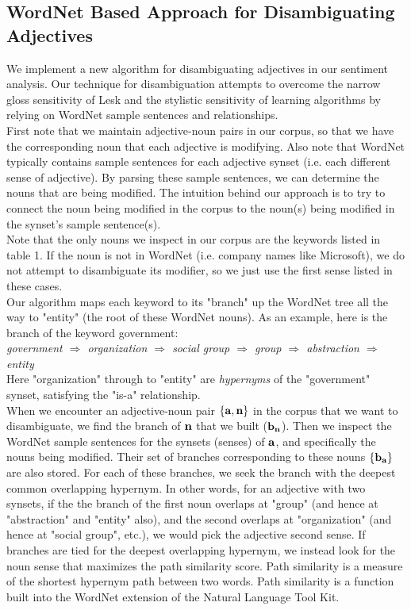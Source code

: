 \documentclass[pageno]{jpaper}
\begin{document}
\subsection{WordNet Based Approach for Disambiguating Adjectives}
\indent We implement a new algorithm for disambiguating adjectives in our sentiment analysis. Our technique for disambiguation attempts to overcome the narrow gloss sensitivity of Lesk and the stylistic sensitivity of learning algorithms by relying on WordNet sample sentences and relationships. \\
\indent First note that we maintain adjective-noun pairs in our corpus, so that we have the corresponding noun that each adjective is modifying. Also note that WordNet typically contains sample sentences for each adjective synset (i.e. each different sense of adjective). By parsing these sample sentences, we can determine the nouns that are being modified. The intuition behind our approach is to try to connect the noun being modified in the corpus to the noun(s) being modified in the synset's sample sentence(s). \\ \indent Note that the only nouns we inspect in our corpus are the keywords listed in table 1. If the noun is not in WordNet (i.e. company names like Microsoft), we do not attempt to disambiguate its modifier, so we just use the first sense listed in these cases. \\ 
\indent Our algorithm maps each keyword to its "branch" up the WordNet tree all the way to "entity" (the root of these WordNet nouns). As an example, here is the branch of the keyword government: \\
\textit{government $\Rightarrow$ organization $\Rightarrow$ social group $\Rightarrow$ group $\Rightarrow$ abstraction $\Rightarrow$ entity} \\
Here "organization" through to "entity" are \textit{hypernyms} of the "government" synset, satisfying the "is-a" relationship. \\
\indent When we encounter an adjective-noun pair ${\bf \{a,n\}}$ in the corpus that we want to disambiguate, we find the branch of ${\bf n}$ that we built (${\bf b_n}$). Then we inspect the WordNet sample sentences for the synsets (senses) of ${\bf a}$, and specifically the nouns being modified. Their set of branches corresponding to these nouns ${\bf \{b_a\}}$ are also stored. For each of these branches, we seek the branch with the deepest common overlapping hypernym. In other words, for an adjective with two synsets, if the the branch of the first noun overlaps at "group" (and hence at "abstraction" and "entity" also), and the second overlaps at "organization" (and hence at "social group", etc.), we would pick the adjective second sense. If branches are tied for the deepest overlapping hypernym, we instead look for the noun sense that maximizes the path similarity score. Path similarity is a measure of the shortest hypernym path between two words. Path similarity is a function built into the WordNet extension of the Natural Language Tool Kit.
\end{document}
